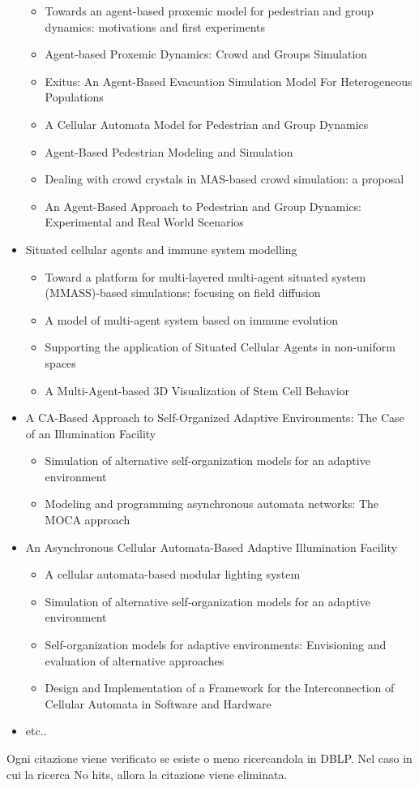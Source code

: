 \documentclass[12pt]{article}
\begin{document}
\begin{itemize}
\begin{itemize}
	\item Towards an agent-based proxemic model for pedestrian and group dynamics: motivations and first experiments
	\item Agent-based Proxemic Dynamics: Crowd and Groups Simulation
	\item Exitus: An Agent-Based Evacuation Simulation Model For Heterogeneous Populations
	\item A Cellular Automata Model for Pedestrian and Group Dynamics
	\item Agent-Based Pedestrian Modeling and Simulation
	\item Dealing with crowd crystals in MAS-based crowd simulation: a proposal
	\item An Agent-Based Approach to Pedestrian and Group Dynamics: Experimental and Real World Scenarios
\end{itemize}
\item Situated cellular agents and immune system modelling
\begin{itemize}
	\item Toward a platform for multi-layered multi-agent situated system (MMASS)-based simulations: focusing on field diffusion
	\item A model of multi-agent system based on immune evolution
	\item Supporting the application of Situated Cellular Agents in non-uniform spaces
	\item A Multi-Agent-based 3D Visualization of Stem Cell Behavior
\end{itemize}
\item A CA-Based Approach to Self-Organized Adaptive Environments: The Case of an Illumination Facility
\begin{itemize}
	\item Simulation of alternative self-organization models for an adaptive environment
	\item Modeling and programming asynchronous automata networks: The MOCA approach
\end{itemize}
\item An Asynchronous Cellular Automata-Based Adaptive Illumination Facility
\begin{itemize}
	\item A cellular automata-based modular lighting system
	\item Simulation of alternative self-organization models for an adaptive environment
	\item Self-organization models for adaptive environments: Envisioning and evaluation of alternative approaches
	\item Design and Implementation of a Framework for the Interconnection of Cellular Automata in Software and Hardware
\end{itemize}
\item etc..
\end{itemize}
Ogni citazione viene verificato se esiste o meno ricercandola in DBLP. Nel caso in cui la ricerca No hits, allora la citazione viene eliminata.
\end{document}
